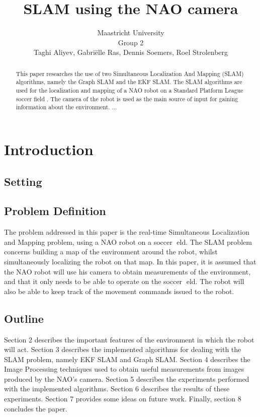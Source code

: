 \documentclass{ba-kecs}
\title{SLAM using the NAO camera}
\author{Maastricht University \\ Group 2 \\ Taghi Aliyev, Gabri\"elle Ras, Dennis Soemers, Roel Strolenberg}
\numberwithin{figure}{section}
\numberwithin{equation}{section}
\begin{document}
\maketitle


\begin{abstract}

This paper researches the use of two Simultaneous Localization And Mapping (SLAM) algorithms, namely the Graph SLAM and the EKF SLAM. The SLAM algorithms are used for the localization and mapping of a NAO robot on a Standard Platform League soccer field \cite{cd1}. The camera of the robot is used as the main source of input for gaining information about the environment.
...

\end{abstract}


\section{Introduction}


\subsection{Setting}



\subsection{Problem Definition}
The problem addressed in this paper is the real-time Simultaneous Localization and Mapping problem, using a NAO robot on a soccer eld. The SLAM problem concerns building a map of the environment around the robot, whilst simultaneously localizing the robot on that map. 
	In this paper, it is assumed that the NAO robot will use his camera to obtain measurements of the environment, and that it only needs to be able to operate on the soccer eld. The robot will also be able to keep track of the movement commands issued to the robot.

\subsection{Outline}
Section 2 describes the important features of the environment in which the robot will act. Section 3 describes the implemented algorithms for dealing with the SLAM problem, namely EKF SLAM and Graph SLAM. Section 4 describes the Image Processing techniques used to obtain useful measurements from images produced by the NAO's camera. Section 5 describes the experiments performed with the implemented algorithms. Section 6 describes the results of these experiments. Section 7 provides some ideas on future work. Finally, section 8 concludes the paper.
\end{document}
